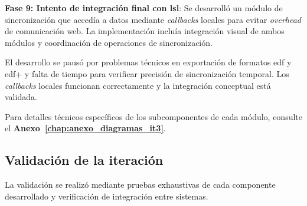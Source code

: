 \textbf{Fase 9: Intento de integración final con \textbf{\acrshort{lsl}}}:
Se desarrolló un módulo de sincronización que accedía a datos mediante \textit{\glspl{callback}} locales para evitar \textit{\gls{overhead}} de comunicación web. La implementación incluía integración visual de ambos módulos y coordinación de operaciones de sincronización.

El desarrollo se pausó por problemas técnicos en exportación de formatos \acrshort{edf} y \acrshort{edf+} y falta de tiempo para verificar precisión de sincronización temporal. Los \textit{\glspl{callback}} locales funcionan correctamente y la integración conceptual está validada.

Para detalles técnicos específicos de los subcomponentes de cada módulo, consulte el \textbf{Anexo~\ref{chap:anexo_diagramas_it3}}.

\subsection{Validación de la iteración}
\label{subsec:validacion_iteracion_3}

La validación se realizó mediante pruebas exhaustivas de cada componente desarrollado y verificación de integración entre sistemas.

